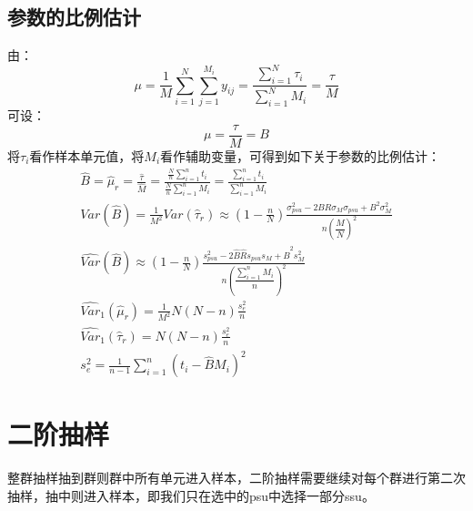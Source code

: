 \subsection{参数的比例估计}
由：
\begin{equation*}
	\mu=\frac{1}{M}\sum_{i=1}^{N}\sum_{j=1}^{M_i}y_{ij}=\frac{\sum\limits_{i=1}^{N}\tau_i}{\sum\limits_{i=1}^{N}M_i}=\frac{\tau}{M}
\end{equation*}
可设：
\begin{equation*}
	\mu=\frac{\tau}{M}=B
\end{equation*}
将$\tau_i$看作样本单元值，将$M_i$看作辅助变量，可得到如下关于参数的比例估计：
\begin{gather*}
	\hat{B}=\hat{\mu}_r=\frac{\hat{\tau}}{\hat{M}}=\frac{\frac{N}{n}\sum_{i=1}^nt_i}{\frac{N}{n}\sum_{i=1}^nM_i}=\frac{\sum_{i=1}^{n}t_i}{\sum_{i=1}^{n}M_i} \\
	Var(\hat{B})=\frac{1}{M^2}Var(\hat{\tau}_r)\approx\left(1-\frac{n}{N}\right)\frac{\sigma_{psu}^2-2BR\sigma_{M}\sigma_{psu}+B^2\sigma_{M}^2}{n(\dfrac{M}{N})^2} \\
	\widehat{Var}(\hat{B})\approx\left(1-\frac{n}{N}\right)\frac{s_{psu}^2-2\hat{B}\hat{R}s_{psu}s_M+\hat{B}^2s_M^2}{n(\dfrac{\sum_{i=1}^{n}M_i}{n})^2} \\
	\widehat{Var}_1(\hat{\mu}_r)=\frac{1}{M^2}N\left(N-n\right)\frac{s_e^2}{n} \\
	\widehat{Var}_1(\hat{\tau}_r)=N\left(N-n\right)\frac{s_e^2}{n} \\
	s_e^2=\frac{1}{n-1}\sum_{i=1}^{n}\left(t_i-\hat{B}M_i\right)^2
\end{gather*}
\section{二阶抽样}
整群抽样抽到群则群中所有单元进入样本，二阶抽样需要继续对每个群进行第二次抽样，抽中则进入样本，即我们只在选中的psu中选择一部分ssu。
